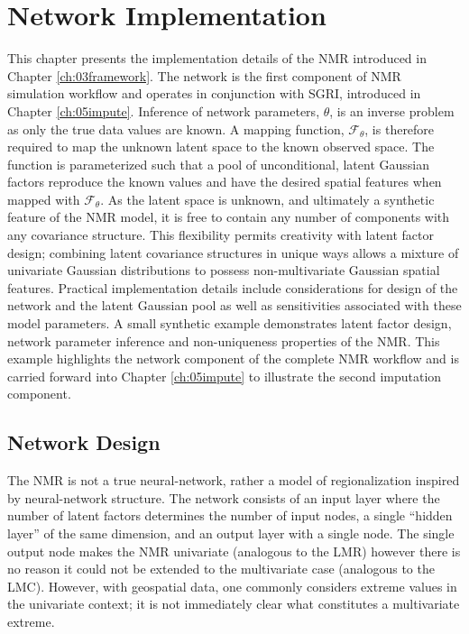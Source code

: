 
\chapter{Network Implementation}
\label{ch:04implement}

This chapter presents the implementation details of the \gls{NMR} introduced in Chapter \ref{ch:03framework}. The network is the first component of \gls{NMR} simulation workflow and operates in conjunction with \gls{SGRI}, introduced in Chapter \ref{ch:05impute}. Inference of network parameters, $\theta$, is an inverse problem as only the true data values are known. A mapping function, $\mathcal{F}_{\theta}$, is therefore required to map the unknown latent space to the known observed space. The function is parameterized such that a pool of unconditional, latent Gaussian factors reproduce the known values and have the desired spatial features when mapped with $\mathcal{F}_{\theta}$. As the latent space is unknown, and ultimately a synthetic feature of the \gls{NMR} model, it is free to contain any number of components with any covariance structure. This flexibility permits creativity with latent factor design; combining latent covariance structures in unique ways allows a mixture of univariate Gaussian distributions to possess non-multivariate Gaussian spatial features. Practical implementation details include considerations for design of the network and the latent Gaussian pool as well as sensitivities associated with these model parameters. A small synthetic example demonstrates latent factor design, network parameter inference and non-uniqueness properties of the \gls{NMR}. This example highlights the network component of the complete \gls{NMR} workflow and is carried forward into Chapter \ref{ch:05impute} to illustrate the second imputation component.

\FloatBarrier
\section{Network Design}
\label{sec:networkd}

The \gls{NMR} is not a true neural-network, rather a model of regionalization inspired by neural-network structure. The network consists of an input layer where the number of latent factors determines the number of input nodes, a single ``hidden layer'' of the same dimension, and an output layer with a single node.  The single output node makes the \gls{NMR} univariate (analogous to the \gls{LMR}) however there is no reason it could not be extended to the multivariate case (analogous to the \gls{LMC}). However, with geospatial data, one commonly considers extreme values in the univariate context; it is not immediately clear what constitutes a multivariate extreme.

